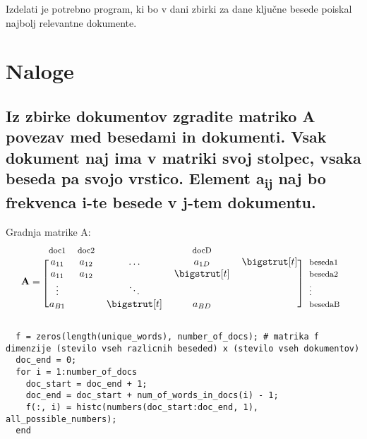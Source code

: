 \documentclass{article}
\begin{document}
Izdelati je potrebno program, ki bo v dani zbirki za dane ključne besede poiskal najbolj relevantne dokumente.

\section{Naloge}
\subsection{Iz zbirke dokumentov zgradite matriko A povezav med besedami in dokumenti. Vsak dokument naj ima v matriki svoj stolpec, vsaka beseda pa svojo vrstico. Element a\textsubscript{ij} naj bo frekvenca i-te besede v j-tem dokumentu.}

Gradnja matrike A:
\begin{equation*}
  \mathbf{A}=
  \begin{blockarray}{*{5}{c} l}
    \begin{block}{*{5}{>{$\footnotesize}c<{$}} l}
      doc1 & doc2 &  &  docD & \\
    \end{block}
    \begin{block}{[*{5}{c}]>{$\footnotesize}l<{$}}
      a_{11}  & a_{12} & \dots           & a_{1D}       & \bigstrut[t]& beseda1 \\
       a_{11} & a_{12} &                    & \bigstrut[t] &                   &   beseda2 \\
      \vdots   &             & \ddots         &                    &                   &   \vdots  \\
      a_{B1} &              &  \bigstrut[t] & a_{BD}       &                   &  besedaB \\
    \end{block}
  \end{blockarray}
\end{equation*}


\begin{lstlisting}
  f = zeros(length(unique_words), number_of_docs); # matrika f dimenzije (stevilo vseh razlicnih beseded) x (stevilo vseh dokumentov)
  doc_end = 0;
  for i = 1:number_of_docs
    doc_start = doc_end + 1;
    doc_end = doc_start + num_of_words_in_docs(i) - 1;
    f(:, i) = histc(numbers(doc_start:doc_end, 1), all_possible_numbers);
  end
\end{lstlisting}
\end{document}
